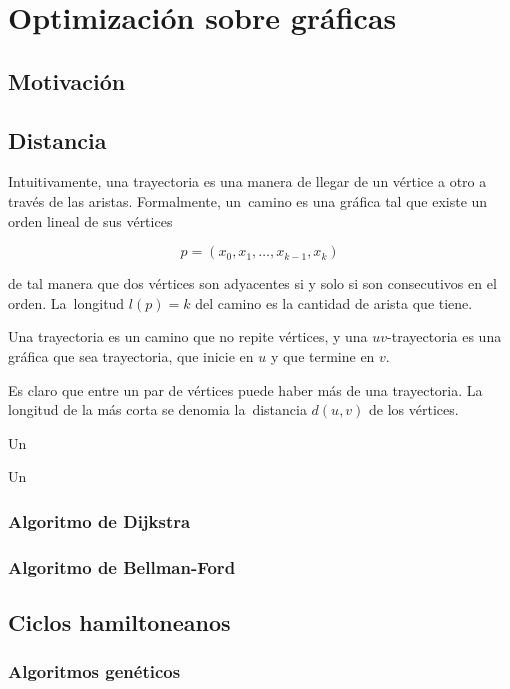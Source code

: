 \chapter{Optimización sobre gráficas}

\section{Motivación}

\section{Distancia}

Intuitivamente, una trayectoria es una manera de llegar de un vértice a otro a
través de las aristas. Formalmente, un~camino es una gráfica tal
que existe un orden lineal de sus vértices

\[
    p = (x_{0}, x_{1}, \dots, x_{k-1}, x_{k})
\]

de tal manera que dos vértices son adyacentes si y solo si son consecutivos en
el orden. La~longitud $l(p) = k$ del camino es la cantidad de
arista que tiene.

Una trayectoria es un camino que no repite vértices, y una $uv$-trayectoria es
una gráfica que sea trayectoria, que inicie en $u$ y que termine en $v$.

Es claro que entre un par de vértices puede haber más de una trayectoria. La
longitud de la más corta se denomia la~distancia $d(u, v)$ de
los vértices.

Un 

Un 

\subsection{Algoritmo de Dijkstra}

\subsection{Algoritmo de Bellman-Ford}

\section{Ciclos hamiltoneanos}

\subsection{Algoritmos genéticos}

